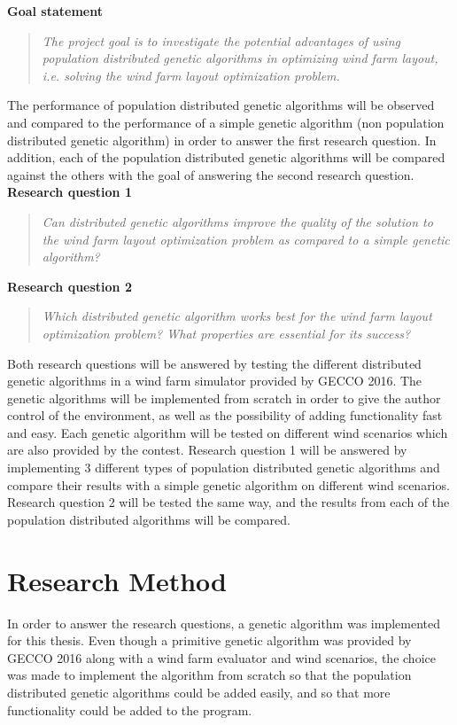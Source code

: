 \noindent \textbf{Goal statement}

\begin{quote}
\textit{The project goal is to investigate the potential advantages of using population distributed genetic algorithms in optimizing wind farm layout, i.e. solving the wind farm layout optimization problem.} \citep{Samorani}
\end{quote}

\noindent The performance of population distributed genetic algorithms will be observed and compared to the performance of a simple genetic algorithm (non population distributed genetic algorithm) in order to answer the first research question. In addition, each of the population distributed genetic algorithms will be compared against the others with the goal of answering the second research question. \\

\noindent \textbf{Research question 1}

\begin{quote}
\textit{Can distributed genetic algorithms improve the quality of the solution to the wind farm layout optimization problem as compared to a simple genetic algorithm?}
\end{quote}

\noindent \textbf{Research question 2}

\begin{quote}
\textit{Which distributed genetic algorithm works best for the wind farm layout optimization problem? What properties are essential for its success?}
\end{quote}

\noindent Both research questions will be answered by testing the different distributed genetic algorithms in a wind farm simulator provided by GECCO 2016. The genetic algorithms will be implemented from scratch in order to give the author control of the environment, as well as the possibility of adding functionality fast and easy. Each genetic algorithm will be tested on different wind scenarios which are also provided by the contest. Research question 1 will be answered by implementing 3 different types of population distributed genetic algorithms and compare their results with a simple genetic algorithm on different wind scenarios. Research question 2 will be tested the same way, and the results from each of the population distributed algorithms will be compared.


\section{Research Method}\label{section:researchmethod}
In order to answer the research questions, a genetic algorithm was implemented for this thesis. Even though a primitive genetic algorithm was provided by GECCO 2016 along with a wind farm evaluator and wind scenarios, the choice was made to implement the algorithm from scratch so that the population distributed genetic algorithms could be added easily, and so that more functionality could be added to the program. \\

